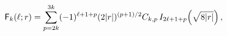 \[{\sf F}_{k}(\ell;r)=\sum_{p=2k}^{3k}(-1)^{\ell+1+p}(2|r|)^{(p+1)/2}C_{k,p}%
\mathop{I_{2\ell+1+p}\/}\nolimits\!\left(\sqrt{8|r|}\right),\]